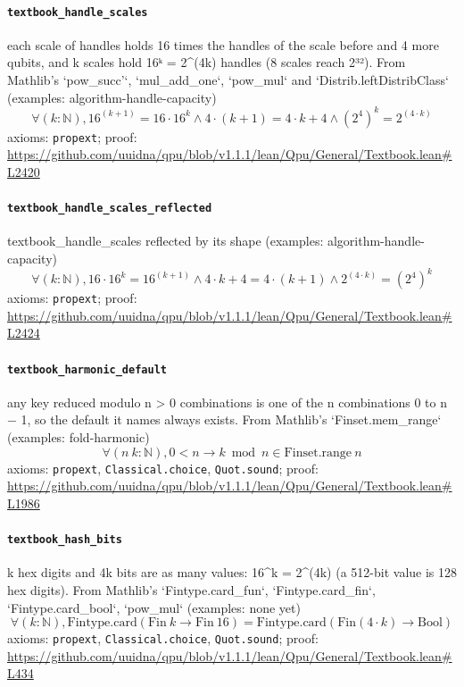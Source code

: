 \documentclass[11pt]{article}
\begin{document}
\paragraph{\texttt{textbook\_handle\_scales}}
each scale of handles holds 16 times the handles of the scale before and 4 more qubits, and k scales hold 16ᵏ = 2\^{}(4k) handles (8 scales reach 2³²). From Mathlib's `pow\_succ'`, `mul\_add\_one`, `pow\_mul` and `Distrib.leftDistribClass` (examples: algorithm-handle-capacity)
\[ \forall (k : \mathbb{N}), 16 ^{(k + 1)} = 16 \cdot 16 ^{k} \land 4 \cdot (k + 1) = 4 \cdot k + 4 \land (2 ^{4}) ^{k} = 2 ^{(4 \cdot k)} \]
\noindent axioms: \texttt{propext}; proof: \url{https://github.com/uuidna/qpu/blob/v1.1.1/lean/Qpu/General/Textbook.lean\#L2420}

\paragraph{\texttt{textbook\_handle\_scales\_reflected}}
textbook\_handle\_scales reflected by its shape (examples: algorithm-handle-capacity)
\[ \forall (k : \mathbb{N}), 16 \cdot 16 ^{k} = 16 ^{(k + 1)} \land 4 \cdot k + 4 = 4 \cdot (k + 1) \land 2 ^{(4 \cdot k)} = (2 ^{4}) ^{k} \]
\noindent axioms: \texttt{propext}; proof: \url{https://github.com/uuidna/qpu/blob/v1.1.1/lean/Qpu/General/Textbook.lean\#L2424}

\paragraph{\texttt{textbook\_harmonic\_default}}
any key reduced modulo n > 0 combinations is one of the n combinations 0 to n − 1, so the default it names always exists. From Mathlib's `Finset.mem\_range` (examples: fold-harmonic)
\[ \forall (n\ k : \mathbb{N}), 0 < n \to k \bmod n \in \mathrm{Finset.range}\ n \]
\noindent axioms: \texttt{propext}, \texttt{Classical.choice}, \texttt{Quot.sound}; proof: \url{https://github.com/uuidna/qpu/blob/v1.1.1/lean/Qpu/General/Textbook.lean\#L1986}

\paragraph{\texttt{textbook\_hash\_bits}}
k hex digits and 4k bits are as many values: 16\^{}k = 2\^{}(4k) (a 512-bit value is 128 hex digits). From Mathlib's `Fintype.card\_fun`, `Fintype.card\_fin`, `Fintype.card\_bool`, `pow\_mul` (examples: none yet)
\[ \forall (k : \mathbb{N}), \mathrm{Fintype.card} (\mathrm{Fin}\ k \to \mathrm{Fin}\ 16) = \mathrm{Fintype.card} (\mathrm{Fin} (4 \cdot k) \to \mathrm{Bool}) \]
\noindent axioms: \texttt{propext}, \texttt{Classical.choice}, \texttt{Quot.sound}; proof: \url{https://github.com/uuidna/qpu/blob/v1.1.1/lean/Qpu/General/Textbook.lean\#L434}
\end{document}
